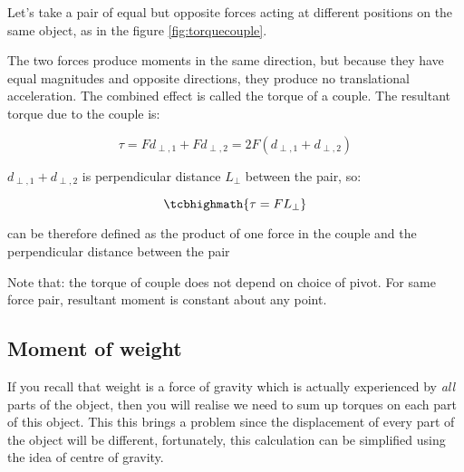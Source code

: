 Let's take a pair of equal but opposite forces acting at different positions on the same object, as in the figure \ref{fig:torquecouple}.

\begin{marginfigure}
	\centering
	\vspace*{-8pt}
	\vspace*{-16pt}
 \label{fig:torquecouple}
\end{marginfigure}

The two forces produce moments in the same direction, but because they have equal magnitudes and opposite directions, they produce no translational acceleration. The combined effect is called the torque of a couple. The resultant torque due to the couple is:

	$$ \tau = Fd_{\perp,1} + Fd_{\perp,2} = 2F(d_{\perp,1} + d_{\perp,2}) $$

$d_{\perp,1} + d_{\perp,2}$ is perpendicular distance $L_\perp$ between the pair, so:

$$ \tcbhighmath{\tau = F L_\perp} $$

\begin{ilight}
	 can be therefore defined as the product of one force in the couple and the perpendicular distance between the pair
\end{ilight}
Note that: the torque of couple does not depend on choice of pivot. For same force pair, resultant moment is constant about any point.



\subsection{Moment of weight}

If you recall that weight is a force of gravity which is actually experienced by \emph{all} parts of the object, then you will realise  we need to sum up torques on each part of this object. This this brings a problem since the displacement of every part of the object will be different, fortunately, this calculation can be simplified using the idea of centre of gravity.

